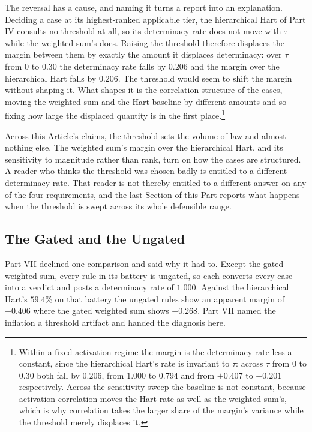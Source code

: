 The reversal has a cause, and naming it turns a report into an
explanation. Deciding a case at its highest-ranked applicable tier, the hierarchical
Hart of Part IV consults no threshold at all, so its determinacy rate
does not move with $\tau$ while the weighted sum's does.
Raising the threshold therefore displaces the margin between them by
exactly the amount it displaces determinacy: over $\tau$ from $0$ to
$0.30$ the determinacy rate falls by $0.206$ and the margin over the
hierarchical Hart falls by $0.206$. The threshold would seem to shift the margin without shaping it. What shapes it is the correlation structure of the
cases, moving the weighted sum and the Hart baseline by different
amounts and so fixing how large the displaced quantity is in the first
place.\footnote{Within a fixed activation regime the margin is the
determinacy rate less a constant, since the hierarchical Hart's rate is
invariant to $\tau$: across $\tau$ from $0$ to $0.30$ both fall by
$0.206$, from $1.000$ to $0.794$ and from $+0.407$ to $+0.201$
respectively. Across the sensitivity sweep the baseline is not constant,
because activation correlation moves the Hart rate as well as the
weighted sum's, which is why correlation takes the larger share of the
margin's variance while the threshold merely displaces it.}

Across this Article's claims, the threshold sets the volume of law and
almost nothing else. The weighted sum's margin over the hierarchical Hart,
and its sensitivity to magnitude rather than rank, turn on how the cases are
structured. A reader who thinks the threshold was chosen badly is
entitled to a different determinacy rate. That reader is not thereby
entitled to a different answer on any of the four requirements, and the last Section of this Part reports what happens when the threshold
is swept across its whole defensible range.

\subsection{The Gated and the Ungated}

Part VII declined one comparison and said why it had to. Except the gated weighted sum, every rule in its battery is ungated, so
each converts every case into a verdict and posts a determinacy rate of
$1.000$.
Against the hierarchical Hart's $59.4\%$ on that battery the ungated
rules show an apparent margin of $+0.406$ where the gated weighted sum
shows $+0.268$. Part VII named the inflation a threshold artifact and
handed the diagnosis here.

